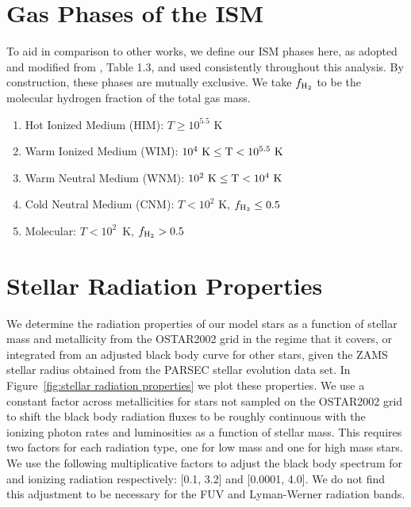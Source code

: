 \documentclass[twocolumn]{aastex61}
\begin{document}
\section{Gas Phases of the ISM}
\label{appendix:phases}

To aid in comparison to other works, we define our ISM phases here, as adopted and modified from \citet{Draine2011}, Table 1.3, and used consistently throughout this analysis. By construction, these phases are mutually exclusive. We take $f_{\rm H_2}$ to be the molecular hydrogen fraction of the total gas mass.

\begin{enumerate}
\item Hot Ionized Medium (HIM): $T \geq 10^{5.5}$ K
\item Warm Ionized Medium (WIM): $10^{4}~\rm{K} \leq T < 10^{5.5}~\rm{K} $
\item Warm Neutral Medium (WNM): $10^{2}~\rm{K} \leq T < 10^{4}~ \rm{K}$
\item Cold Neutral Medium (CNM): $T < 10^2$ K, $f_{\rm H_2} \leq 0.5$
\item Molecular: $T < 10^2$~K, $f_{\rm H_2} > 0.5$
\end{enumerate}

\section{Stellar Radiation Properties}
\label{appendix:radiation}
We determine the radiation properties of our model stars as a function of stellar mass and metallicity from the OSTAR2002 grid \citep{Lanz2003} in the regime that it covers, or integrated from an adjusted black body curve for other stars, given the ZAMS stellar radius obtained from the PARSEC \citep{Bressan2012,Tang2014} stellar evolution data set. In Figure~\ref{fig:stellar radiation properties} we plot these properties. We use a constant factor across metallicities for stars not sampled on the OSTAR2002 grid to shift the black body radiation fluxes to be roughly continuous with the ionizing photon rates and luminosities as a function of stellar mass. This requires two factors for each radiation type, one for low mass and one for high mass stars. We use the following multiplicative factors to adjust the black body spectrum for  and  ionizing radiation respectively: [0.1, 3.2] and [0.0001, 4.0]. We do not find this adjustment to be necessary for the FUV and Lyman-Werner radiation bands.
\end{document}
